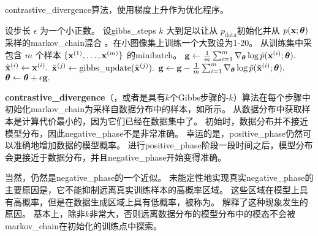 \begin{algorithm}[ht]
\caption{\gls{contrastive_divergence}算法，使用梯度上升作为优化程序。}
\label{alg:cd}
\begin{algorithmic}
\STATE 设步长 $\epsilon$ 为一个小正数。
\STATE 设\gls{gibbs_steps} $k$ 大到足以让从 $p_\text{data}$初始化并从 $p(\mathbf{x}; \boldsymbol{\theta})$采样的\gls{markov_chain}混合 。在小图像集上训练一个大致设为1-20。
\STATE 从训练集中采包含 $m$ 个样本 $\{ \mathbf{x}^{(1)}, \dots, \mathbf{x}^{(m)}\}$ 的\gls{minibatch}。
\STATE $\mathbf{g} \leftarrow \frac{1}{m} \sum_{i=1}^m \nabla_{\boldsymbol{\theta}} \log \tilde{p}(\mathbf{x}^{(i)}; \boldsymbol{\theta}).$
        \STATE $\tilde{\mathbf{x}}^{(i)} \leftarrow \mathbf{x}^{(i)}.$
    \ENDFOR
{}
        \STATE $\tilde{\mathbf{x}}^{(j)} \leftarrow \text{gibbs\_update}(\tilde{\mathbf{x}}^{(j)}).$
    \ENDFOR
\ENDFOR
\STATE $\mathbf{g} \leftarrow \mathbf{g} - \frac{1}{m} \sum_{i=1}^m \nabla_{\boldsymbol{\theta}} \log \tilde{p}( \tilde{\mathbf{x}}^{(i)} ; \boldsymbol{\theta} ) .$
\STATE $\boldsymbol{\theta} \leftarrow \boldsymbol{\theta} + \epsilon \mathbf{g}.$
\ENDWHILE
\end{algorithmic}
\end{algorithm}


\textbf{\gls{contrastive_divergence}}（，或者是具有$k$个Gibbs步骤的-$k$）算法在每个步骤中初始化\gls{markov_chain}为采样自数据分布中的样本\citep{Hinton-PoE-2000,Hinton-RBMguide-small}，如所示。
从数据分布中获取样本是计算代价最小的，因为它们已经在数据集中了。
初始时，数据分布并不接近模型分布，因此\gls{negative_phase}不是非常准确。
幸运的是，\gls{positive_phase}仍然可以准确地增加数据的模型概率。
进行\gls{positive_phase}阶段一段时间之后，模型分布会更接近于数据分布，并且\gls{negative_phase}开始变得准确。


当然，仍然是\gls{negative_phase}的一个近似。
未能定性地实现真实\gls{negative_phase}的主要原因是，它不能抑制远离真实训练样本的高概率区域。
这些区域在模型上具有高概率，但是在数据生成区域上具有低概率，被称为。
解释了这种现象发生的原因。
基本上，除非$k$非常大，否则远离数据分布的模型分布中的模态不会被\gls{markov_chain}在初始化的训练点中探索。



